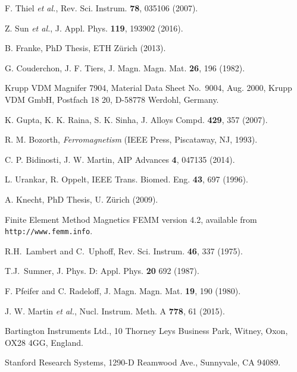 \documentclass[review]{elsarticle}
\begin{document}
\begin{thebibliography}{00}
 F. Thiel {\it et al.}, Rev. Sci. Instrum. {\bf 78}, 035106 (2007).

 Z. Sun {\it et al.}, J. Appl. Phys. {\bf
  119}, 193902 (2016).

 B. Franke, PhD Thesis, ETH Z\"urich (2013).

 G. Couderchon, J. F. Tiers,
  J. Magn. Magn. Mat. {\bf 26}, 196 (1982).

 Krupp VDM Magnifer 7904, Material Data Sheet
  No.~9004, Aug. 2000, Krupp VDM GmbH, Postfach 18 20, D-58778
  Werdohl, Germany.

 K. Gupta, K. K. Raina, S. K. Sinha, J. Alloys
  Compd. {\bf 429}, 357 (2007).

 R. M. Bozorth, {\it Ferromagnetism} (IEEE Press,
  Piscataway, NJ, 1993).

 C. P. Bidinosti, J. W. Martin, AIP Advances
  {\bf 4}, 047135 (2014).

 L. Urankar, R. Oppelt, IEEE
  Trans. Biomed. Eng. {\bf 43}, 697 (1996).

 A. Knecht, PhD Thesis, U. Z\"urich (2009).

 Finite Element Method Magnetics FEMM version 4.2,
  available from {\tt http://www.femm.info}.


 R.H.\ Lambert and C.\ Uphoff, Rev. Sci. Instrum. {\bf 46},  337 (1975).

 T.J.\ Sumner,  J. Phys. D: Appl. Phys. {\bf 20} 692 (1987).






 F. Pfeifer and C. Radeloff,
  J. Magn. Magn. Mat. {\bf 19}, 190 (1980).

 J. W. Martin {\it et al.},
  Nucl. Instrum. Meth. A {\bf 778}, 61 (2015).

 Bartington Instruments Ltd., 10 Thorney Leys
  Business Park, Witney, Oxon, OX28 4GG, England.

 Stanford Research Systems, 1290-D Reamwood Ave.,
  Sunnyvale, CA 94089.


\end{thebibliography}
\end{document}
